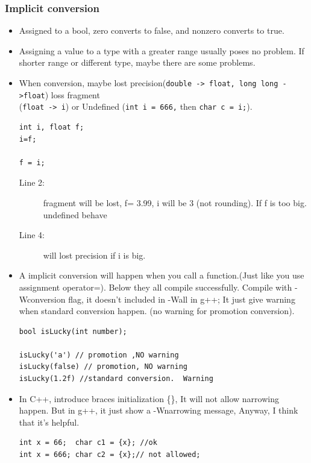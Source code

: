 \documentclass[a4paper,11pt,twoside]{book}
\begin{document}
\subsubsection{Implicit conversion}

\begin{itemize}
	\item Assigned to a bool, zero converts to false, and nonzero converts to true.
	
	\item Assigning a value to a type with a greater range usually poses no problem. If shorter range or different type, maybe there are some problems.
	
	\item When conversion, maybe lost precision(\texttt{double -> float, long long ->float}) loss fragment \\ (\texttt{float -> i}) or Undefined (\texttt{int i = 666,} then \texttt{char c = i;}).
	
\begin{lstlisting}
int i, float f;
i=f;

f = i;
\end{lstlisting}
\begin{description}
	\item[Line 2:] fragment will be lost,  f= 3.99, i will be 3 (not rounding). If f is too big.  undefined behave
	\item[Line 4:] will lost precision if i is big.
\end{description}

	\item A implicit conversion will happen when you call a function.(Just like you use assignment operator=). Below they all compile successfully. Compile with -Wconversion flag, it doesn't included in -Wall in g++; It just give warning when standard conversion happen. (no warning for promotion conversion).
\begin{lstlisting}[numbers=none]
bool isLucky(int number);
	
isLucky('a') // promotion ,NO warning
isLucky(false) // promotion, NO warning
isLucky(1.2f) //standard conversion.  Warning
\end{lstlisting}

	\item In C++, introduce braces initialization \{\}, It will not allow narrowing happen. But in g++, it just show a -Wnarrowing message, Anyway, I think that it's helpful.
\begin{lstlisting}[numbers=none]
int x = 66;  char c1 = {x}; //ok	
int x = 666; char c2 = {x};// not allowed;
	

\end{lstlisting}
\end{itemize}
\end{document}
